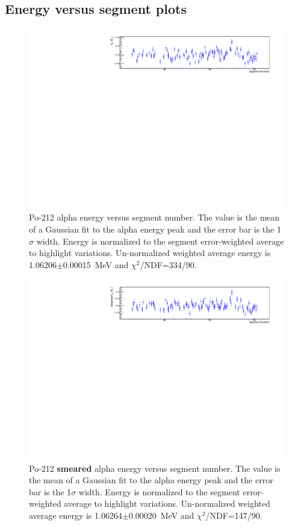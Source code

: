 \subsection{Energy versus segment plots}
\begin{figure}[!h]
\centering
\includegraphics[width=1.05\textwidth]{figures/PubBiPo212EvsCell.pdf}
\caption{\label{fig:EvsCell212}Po-212 alpha energy versus segment number. The value is the mean of a Gaussian fit to the alpha energy peak and the error bar is the 1$\sigma$ width. Energy is normalized to the segment error-weighted average to highlight variations. Un-normalized weighted average energy is 1.06206$\pm$0.00015~MeV and $\chi^2$/NDF=334/90.}
\end{figure}
\begin{figure}[!h]
\centering
\includegraphics[width=1.05\textwidth]{figures/PubBiPo212EsmearvsCell.pdf}
\caption{\label{fig:EsmearvsCell212}Po-212 {\bf smeared} alpha energy versus segment number. The value is the mean of a Gaussian fit to the alpha energy peak and the error bar is the 1$\sigma$ width. Energy is normalized to the segment error-weighted average to highlight variations. Un-normalized weighted average energy is 1.06264$\pm$0.00020~MeV and $\chi^2$/NDF=147/90.}
\end{figure}
